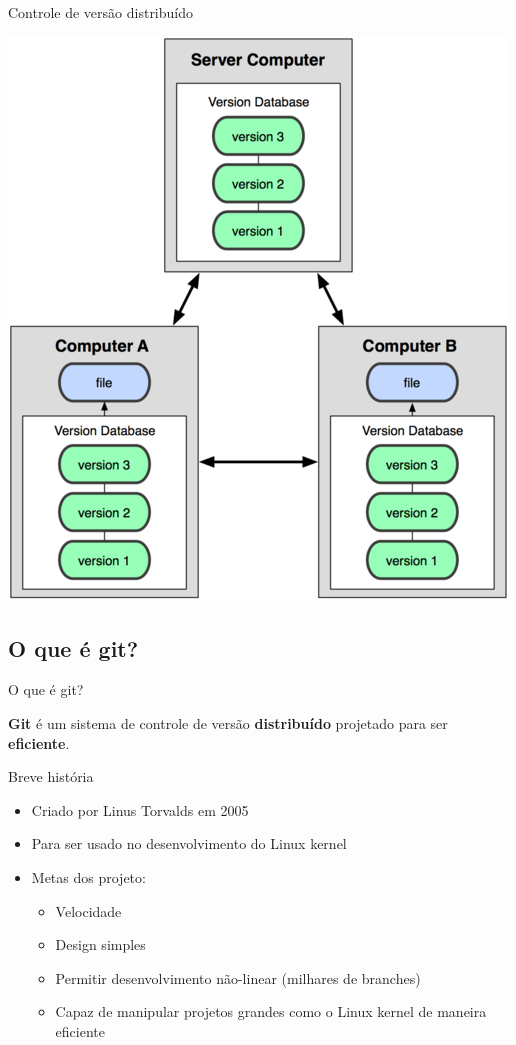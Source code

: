 \documentclass[portuguese,brazil]{beamer}
\newcommand\singlephrase[1]{
  \begin{center}
    \huge #1
  \end{center}
}
\begin{document}
\begin{frame}{Controle de versão distribuído}
\begin{center}
  \includegraphics[scale=.65]{images/distributedvcs.png}
\end{center}
\end{frame}

\subsection{O que é git?}

\begin{frame}{O que é git?}
\singlephrase{\textbf{Git} é um sistema de controle de versão
\textbf{distribuído} projetado para ser \textbf{eficiente}.}
\end{frame}

\begin{frame}{Breve história}
\begin{itemize}
\item Criado por Linus Torvalds em 2005
\item Para ser usado no desenvolvimento do Linux kernel
\item Metas dos projeto:
\begin{itemize}
\item Velocidade
\item Design simples
\item Permitir desenvolvimento não-linear (milhares de branches)
\item Capaz de manipular projetos grandes como o Linux kernel de maneira eficiente
\end{itemize}
\end{itemize}
\end{frame}
\end{document}
